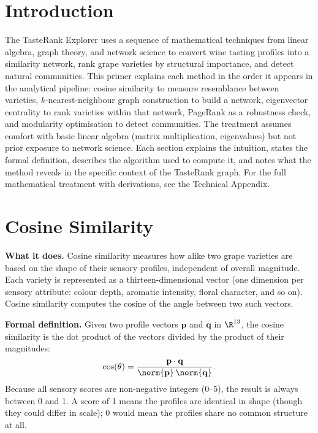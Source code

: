 \documentclass[11pt]{article}
\begin{document}

\section*{Introduction}
The TasteRank Explorer uses a sequence of mathematical techniques from linear algebra, graph theory, and network science to convert wine tasting profiles into a similarity network, rank grape varieties by structural importance, and detect natural communities. This primer explains each method in the order it appears in the analytical pipeline: cosine similarity to measure resemblance between varieties, $k$-nearest-neighbour graph construction to build a network, eigenvector centrality to rank varieties within that network, PageRank as a robustness check, and modularity optimisation to detect communities. The treatment assumes comfort with basic linear algebra (matrix multiplication, eigenvalues) but not prior exposure to network science. Each section explains the intuition, states the formal definition, describes the algorithm used to compute it, and notes what the method reveals in the specific context of the TasteRank graph. For the full mathematical treatment with derivations, see the Technical Appendix.

\section{Cosine Similarity}

\textbf{What it does.} Cosine similarity measures how alike two grape varieties are based on the shape of their sensory profiles, independent of overall magnitude. Each variety is represented as a thirteen-dimensional vector (one dimension per sensory attribute: colour depth, aromatic intensity, floral character, and so on). Cosine similarity computes the cosine of the angle between two such vectors.

\textbf{Formal definition.} Given two profile vectors $\mathbf{p}$ and $\mathbf{q}$ in $\R^{13}$, the cosine similarity is the dot product of the vectors divided by the product of their magnitudes:
\[
\cos(\theta) = \frac{\mathbf{p} \cdot \mathbf{q}}{\norm{\mathbf{p}} \, \norm{\mathbf{q}}}.
\]
Because all sensory scores are non-negative integers (0--5), the result is always between 0 and 1. A score of 1 means the profiles are identical in shape (though they could differ in scale); 0 would mean the profiles share no common structure at all.
\end{document}
